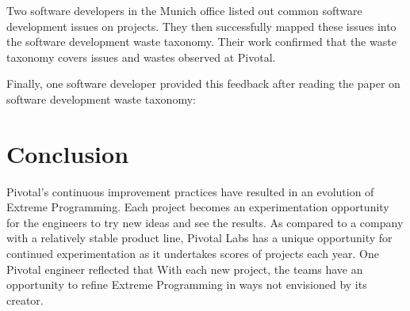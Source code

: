 Two software developers in the Munich office listed out common software development issues on projects. They then successfully mapped these issues into the software development waste taxonomy. Their work confirmed that the waste taxonomy covers issues and wastes observed at Pivotal.

Finally, one software developer provided this feedback after reading the paper on software development waste taxonomy:



\section{Conclusion}
Pivotal's continuous improvement practices have resulted in an evolution of Extreme Programming.  Each project becomes an experimentation opportunity for the engineers to try new ideas and see the results. As compared to a company with a relatively stable product line, Pivotal Labs has a unique opportunity for continued experimentation as it undertakes scores of projects each year. One Pivotal engineer reflected that  With each new project, the teams have an opportunity to refine Extreme Programming in ways not envisioned by its creator. 

